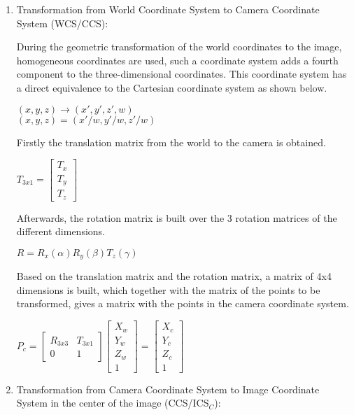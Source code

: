 \begin{enumerate}
    \item Transformation from World Coordinate System to Camera Coordinate System (WCS/CCS):
	
	During the geometric transformation of the world coordinates to the image, homogeneous coordinates are used, such a coordinate system adds a fourth component to the three-dimensional coordinates. This coordinate system has a direct equivalence to the Cartesian coordinate system as shown below.

    \begin{center}
	    $(x, y, z) \rightarrow (x', y', z', w)$\\
        $(x, y, z) = (x'/w, y'/w, z'/w)$
    \end{center}

   Firstly the translation matrix from the world to the camera is obtained.

   \begin{center}
	   $
	   T_{3x1}
	   =
	   \begin{bmatrix} T_x \\ T_y \\ T_z \end{bmatrix}
	   $
	\end{center}

    Afterwards, the rotation matrix is built over the 3 rotation matrices of the different dimensions.

    \begin{center}
	    $ R = R_x(\alpha) R_y(\beta) T_z(\gamma) $
	\end{center}

	Based on the translation matrix and the rotation matrix, a matrix of 4x4 dimensions is built, which together with the matrix of the points to be transformed, gives a matrix with the points in the camera coordinate system.

\begin{center}
	   $
	    P_c
	    =
	    \begin{bmatrix} R_{3x3} & T_{3x1} \\ 0 & 1 \end{bmatrix}
		   \begin{bmatrix} X_w \\ Y_w \\ Z_w \\ 1 \end{bmatrix}
		 =
		   \begin{bmatrix} X_c \\ Y_c \\ Z_c \\ 1 \end{bmatrix}
		  $
\end{center}
	    \item Transformation from Camera Coordinate System to Image Coordinate System in the center of the image (CCS/ICS$_C$):


\end{enumerate}
